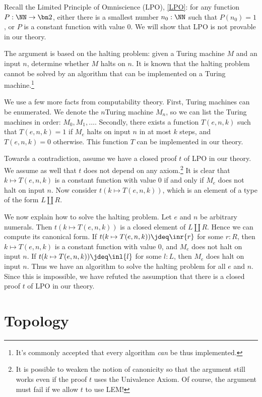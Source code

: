 \begin{remark}\label{rem:LPO-solves-halting problem}
Recall the Limited Principle of Omniscience (LPO), \cref{LPO}:
  for any function $P:\NN\to\bn 2$,
  either there is a smallest number $n_0:\NN$ such that $P(n_0)=1$,
  or $P$ is a constant function with value $0$.
We will show that LPO is not provable in our theory.

The argument is based on the halting problem: given a Turing machine
$M$ and an input $n$, determine whether $M$ halts on $n$.
It is known that the halting problem cannot be solved by an algorithm
that can be implemented on a Turing machine.\footnote{It's commonly accepted that
  every algorithm \emph{can} be thus implemented.}

We use a few more facts from computability theory.
First, Turing machines can be enumerated. We denote the $n$\th Turing machine $M_n$,
so we can list the Turing machines in order: $M_0,M_1,\ldots$.
Secondly, there exists a function $T(e,n,k)$ such that $T(e,n,k) = 1$
if $M_e$ halts on input $n$ in at most $k$ steps, and $T(e,n,k) = 0$
otherwise. This function $T$ can be implemented in our theory.

Towards a contradiction, assume we have a closed proof $t$ of LPO in our theory.
We assume as well that $t$ does not depend on any axiom.\footnote{It is possible to weaken the notion
  of canonicity so that the argument still works even if the proof $t$ uses the Univalence Axiom.
Of course, the argument must fail if we allow $t$ to use LEM!}
It is clear that $k\mapsto T(e,n,k)$ is a constant function with value $0$
if and only if $M_e$ does not halt on input $n$. Now consider $t(k\mapsto T(e,n,k))$,
which is an element of a type of the form $L\coprod R$.

We now explain how to solve the halting problem.
Let $e$ and $n$ be arbitrary numerals.
Then $t(k\mapsto T(e,n,k))$ is a closed element of $L\coprod R$.
Hence we can compute its canonical form. If $t(k\mapsto T(e,n,k))\jdeq\inr{r}$ for some
$r:R$, then $k\mapsto T(e,n,k)$ is a constant function with value $0$,
and $M_e$ does not halt on input $n$. If $t(k\mapsto T(e,n,k))\jdeq\inl{l}$ for some
$l:L$, then $M_e$ does halt on input $n$.
Thus we have an algorithm to solve the halting problem
for all $e$ and $n$. Since this is impossible, we have refuted the assumption
that there is a closed proof $t$ of LPO in our theory.
\end{remark}

\section{Topology}

